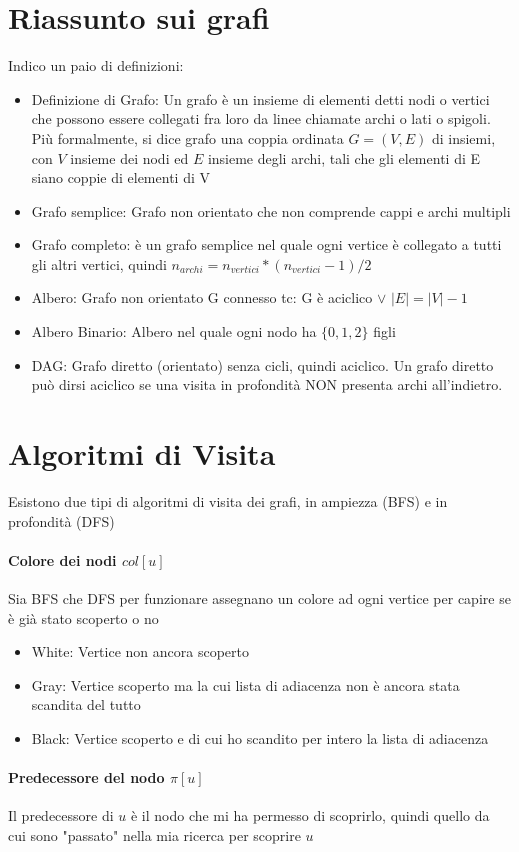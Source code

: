 \documentclass[12pt, a4paper, openany]{book}
\begin{document}
\section{Riassunto sui grafi}
Indico un paio di definizioni:
\begin{itemize}
	\item Definizione di Grafo: Un grafo è un insieme di elementi detti nodi o vertici che possono essere collegati fra loro da linee chiamate archi o lati o spigoli. Più formalmente, si dice grafo una coppia ordinata $G=(V,E)$ di insiemi, con $V$ insieme dei nodi ed $E$ insieme degli archi, tali che gli elementi di E siano coppie di elementi di V
	\item Grafo semplice: Grafo non orientato che non comprende cappi e archi multipli
	\item Grafo completo: è un grafo semplice nel quale ogni vertice è collegato a tutti gli altri vertici, quindi $n_{archi} = n_{vertici} * (n_{vertici} - 1)/2$
	\item Albero: Grafo non orientato G connesso tc: G è aciclico $\lor$ $|E| = |V| - 1$
	\item Albero Binario: Albero nel quale ogni nodo ha $\{0,1,2\}$ figli
	\item DAG: Grafo diretto (orientato) senza cicli, quindi aciclico. Un grafo diretto può dirsi aciclico se una visita in profondità NON presenta archi all'indietro.
\end{itemize}
\section{Algoritmi di Visita}
Esistono due tipi di algoritmi di visita dei grafi, in ampiezza (BFS) e in profondità (DFS)

\paragraph{Colore dei nodi $col[u]$}
Sia BFS che DFS per funzionare assegnano un colore ad ogni vertice per capire se è già stato scoperto o no
\begin{itemize}
	\item White: Vertice non ancora scoperto
	\item Gray: Vertice scoperto ma la cui lista di adiacenza non è ancora stata scandita del tutto
	\item Black: Vertice scoperto e di cui ho scandito per intero la lista di adiacenza
\end{itemize}
\paragraph{Predecessore del nodo $\pi[u]$}
Il predecessore di $u$ è il nodo che mi ha permesso di scoprirlo, quindi quello da cui sono "passato" nella mia ricerca per scoprire $u$
\end{document}
